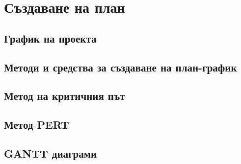 \documentclass[fleqn,12pt]{article}
\begin{document}
\section{Създаване на план}

\subsection{График на проекта}
\subsection{Методи и средства за създаване на план-график}
\subsection{Метод на критичния път}
\subsection{Метод PERT}
\subsection{GANTT диаграми}
\end{document}
